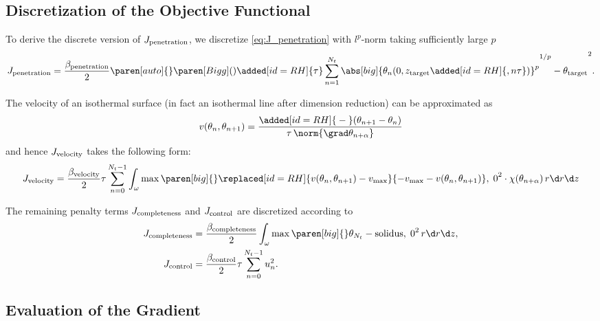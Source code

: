\subsection{Discretization of the Objective Functional}

To derive the discrete version of $J_\textup{penetration}$, we discretize \eqref{eq:J_penetration} with $l^p$-norm taking sufficiently large $p$
\begin{equation} \label{eq:J_penetration_discrete}
	J_\textup{penetration} 
	= 
	\frac{\beta_\textup{penetration}}{2}
	\paren[auto]\{\}{\paren[Bigg](){\added[id=RH]{\tau} \sum_{n=1}^{N_t} \abs[big]{\theta_n(0,z_\textup{target}\added[id=RH]{,n\tau})}^p}^{1/p} - \theta_\textup{target}}^2
	.
\end{equation}

The velocity of an isothermal surface (in fact an isothermal line after dimension reduction) can be approximated as
\begin{equation}
	v(\theta_n, \theta_{n+1}) 
	= 
	\frac{\added[id=RH]{{}-{}}(\theta_{n+1}-\theta_n)}{\tau \, \norm{\grad \theta_{n+\alpha}}}
\end{equation}
and hence $J_\textup{velocity}$ takes the following form:
\begin{equation}
	J_\textup{velocity} 
	=
	\frac{\beta_\textup{velocity}}{2} \tau \sum_{n=0}^{N_t-1} \int_{\omega} \max \paren[big]\{\}{ \replaced[id=RH]{v(\theta_n, \theta_{n+1}) - v_{\max}}{- v_{\max} - v(\theta_n, \theta_{n+1})}, \; 0}^2 \cdot \chi(\theta_{n+\alpha}) \, r \d r \d z
\end{equation}

The remaining penalty terms $J_\textup{completeness}$ and $J_\textup{control}$ are discretized according to
\begin{align}
	J_\textup{completeness} 
	&
	=
	\frac{\beta_\textup{completeness}}{2} \int_{\omega} \max \paren[big]\{\}{\theta_{N_t} - \text{solidus}, \; 0}^2 \, r \d r \d z
	, 
	\\
	J_\textup{control} 
	&
	=
	\frac{\beta_\textup{control}}{2} \tau \sum_{n=0}^{N_t-1} u_n^2
	.
\end{align}


\subsection{Evaluation of the Gradient}

